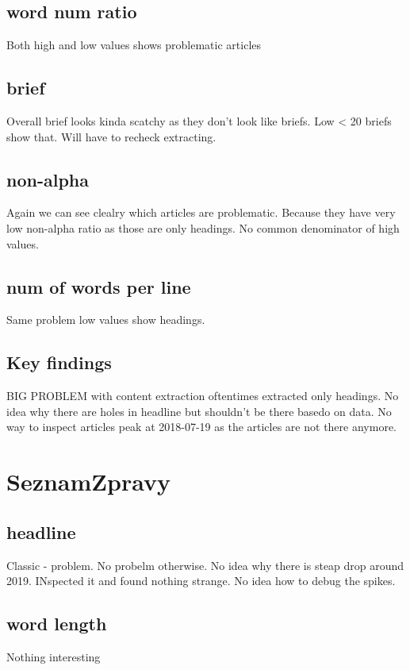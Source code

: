 \documentclass{article}
\begin{document}
    \subsection{word num ratio}
        Both high and low values shows problematic articles

    \subsection{brief}
        Overall brief looks kinda scatchy as they don't look like briefs. Low < 20 briefs show that. Will have to recheck extracting.

    \subsection{non-alpha}
        Again we can see clealry which articles are problematic. Because they have very low non-alpha ratio as those are only headings.
        No common denominator of high values.

    \subsection{num of words per line}
        Same problem low values show headings.
        
    \subsection{Key findings}
        BIG PROBLEM with content extraction oftentimes extracted only headings.
        No idea why there are holes in headline but shouldn't be there basedo on data. No way to inspect articles peak at 2018-07-19 as the articles are not there anymore.



    \section{SeznamZpravy}
    \subsection{headline}
        Classic - problem. No probelm otherwise. No idea why there is steap drop around 2019. INspected it and found nothing strange.
        No idea how to debug the spikes.


    \subsection{word length}
        Nothing interesting
\end{document}
